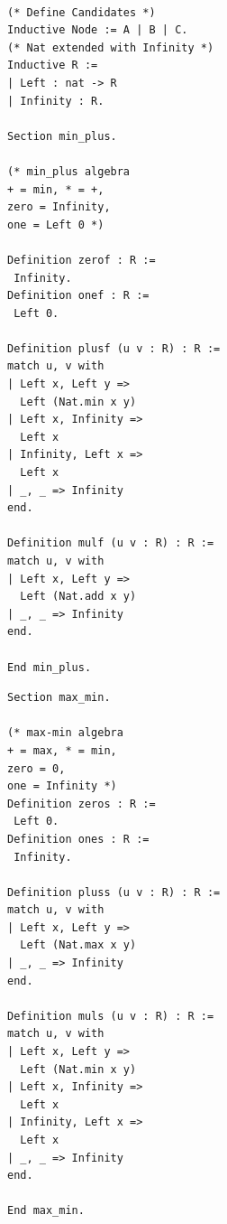 \documentclass[a4paper,UKenglish,cleveref, autoref, thm-restate, anonymous]{lipics-v2021}
\begin{document}
\begin{minipage}{0.5\linewidth}
\begin{lstlisting}[language=Coq]

(* Define Candidates *)
Inductive Node := A | B | C. 
(* Nat extended with Infinity *)
Inductive R := 
| Left : nat -> R 
| Infinity : R.

Section min_plus.

(* min_plus algebra 
+ = min, * = +, 
zero = Infinity,
one = Left 0 *)

Definition zerof : R := 
 Infinity. 
Definition onef : R := 
 Left 0. 

Definition plusf (u v : R) : R :=
match u, v with 
| Left x, Left y => 
  Left (Nat.min x y)
| Left x, Infinity => 
  Left x
| Infinity, Left x => 
  Left x 
| _, _ => Infinity
end. 

Definition mulf (u v : R) : R :=
match u, v with 
| Left x, Left y => 
  Left (Nat.add x y)
| _, _ => Infinity
end. 

End min_plus.

\end{lstlisting}
\end{minipage}
\hfill
\begin{minipage}{0.40\linewidth}
\begin{lstlisting}[language=Coq]
Section max_min.

(* max-min algebra 
+ = max, * = min, 
zero = 0, 
one = Infinity *)
Definition zeros : R := 
 Left 0.
Definition ones : R := 
 Infinity.

Definition pluss (u v : R) : R :=
match u, v with 
| Left x, Left y => 
  Left (Nat.max x y)
| _, _ => Infinity 
end. 

Definition muls (u v : R) : R :=
match u, v with 
| Left x, Left y => 
  Left (Nat.min x y)
| Left x, Infinity => 
  Left x 
| Infinity, Left x => 
  Left x 
| _, _ => Infinity 
end.

End max_min.
\end{lstlisting}
\end{minipage}
\end{document}
